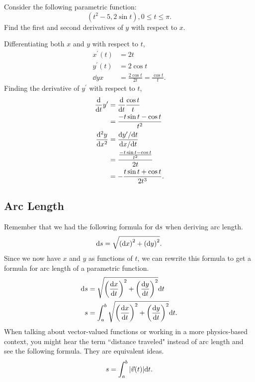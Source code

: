 \begin{example}
	Consider the following parametric function:
	\begin{equation*}
		(t^2-5, 2\sin{t}), 0\leq t\leq\pi.
	\end{equation*}
	Find the first and second derivatives of $y$ with respect to $x$.
\end{example}
Differentiating both $x$ and $y$ with respect to $t$,
\begin{align*}
	x^\prime(t) &= 2t \\
	y^\prime(t) &= 2\cos{t} \\
	\dd{y}{x} &= \frac{2\cos{t}}{2t} = \frac{\cos{t}}{t}.
\end{align*}
Finding the derivative of $y^\prime$ with respect to $t$,
\begin{align*}
	\frac{\mathrm{d} }{\mathrm{d} t}y^\prime &= \frac{\mathrm{d} }{\mathrm{d} t}\frac{\cos{t}}{t} \\
	&= \frac{-t\sin{t}-\cos{t}}{t^2} \\
	\frac{\mathrm{d} ^2y}{\mathrm{d} x^2} &= \frac{\mathrm{d} y^\prime/\mathrm{d} t}{\mathrm{d} x/\mathrm{d} t} \\
	&= \frac{\frac{-t\sin{t}-\cos{t}}{t^2}}{2t} \\
	&= -\frac{t\sin{t}+\cos{t}}{2t^3}.
\end{align*}

\subsection{Arc Length}
Remember that we had the following formula for $\mathrm{d} s$ when deriving arc length.
\begin{equation*}
	\mathrm{d} s = \sqrt{\left(\mathrm{d} x\right)^2 + \left(\mathrm{d} y\right)^2}.
\end{equation*}
Since we now have $x$ and $y$ as functions of $t$, we can rewrite this formula to get a formula for arc length of a parametric function.
\begin{align*}
	\mathrm{d} s &= \sqrt{\left(\frac{\mathrm{d} x}{\mathrm{d} t}\right)^2 + \left(\frac{\mathrm{d} y}{\mathrm{d} t}\right)^2}\mathrm{d} t \\
	s &= \int_{a}^{b}{\sqrt{\left(\frac{\mathrm{d} x}{\mathrm{d} t}\right)^2 + \left(\frac{\mathrm{d} y}{\mathrm{d} t}\right)^2}\mathrm{d} t}.
\end{align*}
\noindent
When talking about vector-valued functions or working in a more physics-based context, you might hear the term ``distance traveled" instead of arc length and see the following formula.
They are equivalent ideas.
\begin{equation*}
	s = \int_{a}^{b}{\lvert \vec{v}(t) \rvert\mathrm{d} t}.
\end{equation*}

